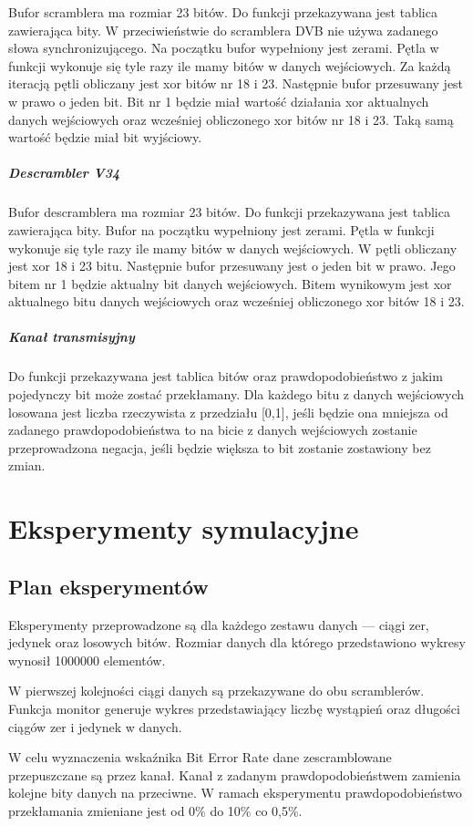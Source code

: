 \documentclass[polish, 11pt]{article}
\begin{document}
    	Bufor scramblera ma rozmiar 23 bitów. Do funkcji przekazywana jest tablica zawierająca bity. W przeciwieństwie do scramblera DVB nie używa zadanego słowa synchronizującego. Na początku bufor wypełniony jest zerami. Pętla w funkcji wykonuje się tyle razy ile mamy bitów w danych wejściowych.  Za każdą iteracją pętli obliczany jest xor bitów nr 18 i 23. Następnie bufor przesuwany jest w prawo o jeden bit. Bit nr 1 będzie miał wartość działania xor aktualnych danych wejściowych oraz wcześniej obliczonego xor bitów nr 18 i 23. Taką samą wartość będzie miał bit wyjściowy.
    	\subparagraph{Descrambler V34\\}
    	Bufor descramblera ma rozmiar 23 bitów. Do funkcji przekazywana jest tablica zawierająca bity. Bufor na początku wypełniony jest zerami. Pętla w funkcji wykonuje się tyle razy ile mamy bitów w danych wejściowych. W pętli obliczany jest xor 18 i 23 bitu. Następnie bufor przesuwany jest o jeden bit w prawo. Jego bitem nr 1 będzie aktualny bit danych wejściowych. Bitem wynikowym jest xor aktualnego bitu danych wejściowych oraz wcześniej obliczonego xor bitów 18 i 23.
    	\subparagraph{Kanał transmisyjny\\}
    	Do funkcji przekazywana jest tablica bitów oraz prawdopodobieństwo z jakim pojedynczy bit może zostać przekłamany. Dla każdego bitu z danych wejściowych losowana jest liczba rzeczywista z przedziału [0,1], jeśli będzie ona mniejsza od zadanego prawdopodobieństwa to na bicie z danych wejściowych zostanie przeprowadzona negacja, jeśli będzie większa to bit zostanie zostawiony bez zmian.
\section{Eksperymenty symulacyjne}
    \subsection{Plan eksperymentów}
        Eksperymenty przeprowadzone są dla każdego zestawu danych --- ciągi zer, jedynek oraz losowych bitów.
        Rozmiar danych dla którego przedstawiono wykresy wynosił 1000000 elementów.

        W pierwszej kolejności ciągi danych są przekazywane do obu scramblerów.
        Funkcja monitor generuje wykres przedstawiający liczbę wystąpień oraz długości ciągów zer i jedynek w danych.

        W celu wyznaczenia wskaźnika Bit Error Rate dane zescramblowane przepuszczane są przez kanał.
        Kanał z zadanym prawdopodobieństwem zamienia kolejne bity danych na przeciwne.
        W ramach eksperymentu prawdopodobieństwo przekłamania zmieniane jest od 0\% do 10\% co 0,5\%.
\end{document}
